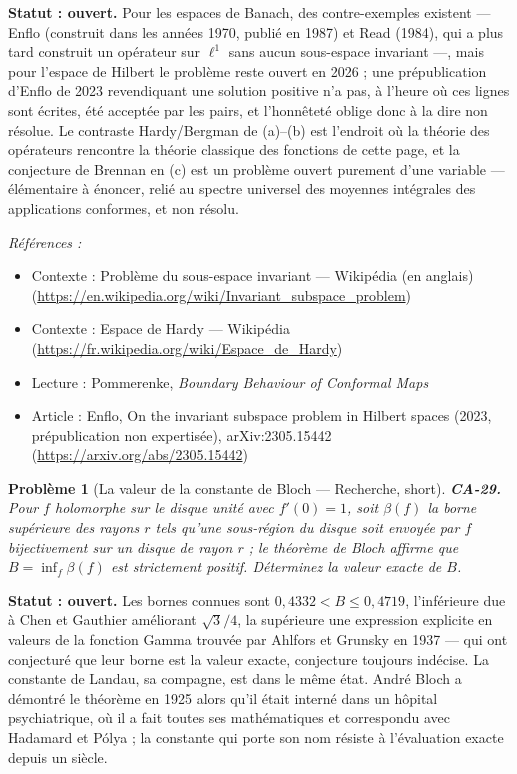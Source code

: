 \documentclass[11pt]{article}
\newtheorem{problem}{Problème}
\newenvironment{refs}{\par\small\noindent\emph{Références :}\begin{itemize}\setlength\itemsep{0pt}}{\end{itemize}\normalsize}
\begin{document}
\noindent \textbf{Statut : ouvert.} Pour les espaces de Banach, des contre-exemples existent
--- Enflo (construit dans les années 1970, publié en 1987) et Read (1984), qui a plus tard construit
un opérateur sur $ \ell^1 $ sans aucun sous-espace invariant ---, mais pour l'espace de Hilbert le
problème reste ouvert en 2026 ; une prépublication d'Enflo de 2023 revendiquant une solution
positive n'a pas, à l'heure où ces lignes sont écrites, été acceptée par les pairs, et l'honnêteté
oblige donc à la dire non résolue. Le contraste Hardy/Bergman de (a)--(b) est l'endroit où la théorie
des opérateurs rencontre la théorie classique des fonctions de cette page, et la conjecture de
Brennan en (c) est un problème ouvert purement d'une variable --- élémentaire à énoncer, relié au
spectre universel des moyennes intégrales des applications conformes, et non résolu.

\begin{refs}
\item Contexte : Problème du sous-espace invariant --- Wikipédia (en anglais) (\url{https://en.wikipedia.org/wiki/Invariant_subspace_problem})
\item Contexte : Espace de Hardy --- Wikipédia (\url{https://fr.wikipedia.org/wiki/Espace_de_Hardy})
\item Lecture : Pommerenke, \textit{Boundary Behaviour of Conformal Maps}
\item Article : Enflo, \og{} On the invariant subspace problem in Hilbert spaces \fg{} (2023, prépublication non expertisée), arXiv:2305.15442 (\url{https://arxiv.org/abs/2305.15442})
\end{refs}

\bigskip

\begin{problem}[{La valeur de la constante de Bloch --- Recherche, short}]
\textbf{CA-29.} Pour $ f $ holomorphe sur le disque unité avec
$ f'(0) = 1 $, soit $ \beta(f) $ la borne supérieure des rayons $ r $ tels qu'une sous-région
du disque soit envoyée par $ f $ bijectivement sur un disque de rayon $ r $ ; le théorème de
Bloch affirme que $ B = \inf_f \beta(f) $ est strictement positif. Déterminez la valeur exacte de
$ B $.
\end{problem}

\noindent \textbf{Statut : ouvert.} Les bornes connues sont
$ 0{,}4332 < B \le 0{,}4719 $, l'inférieure due à Chen et Gauthier améliorant
$ \sqrt{3}/4 $, la supérieure une expression explicite en valeurs de la fonction Gamma trouvée par
Ahlfors et Grunsky en 1937 --- qui ont conjecturé que leur borne est la valeur exacte, conjecture
toujours indécise. La constante de Landau, sa compagne, est dans le même état. André Bloch a
démontré le théorème en 1925 alors qu'il était interné dans un hôpital psychiatrique, où il a fait
toutes ses mathématiques et correspondu avec Hadamard et Pólya ; la constante qui porte son nom
résiste à l'évaluation exacte depuis un siècle.
\end{document}
